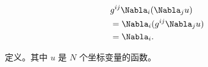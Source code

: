 \begin{equation}
\begin{aligned}
&g^{ij}\Nabla_i(\Nabla_j u)\\
&=\Nabla_i(g^{ij}\Nabla_j u)\\
&=\Nabla_i.
\end{aligned}~
\end{equation}


定义。其中 $u$ 是 $N$ 个坐标变量的函数。





